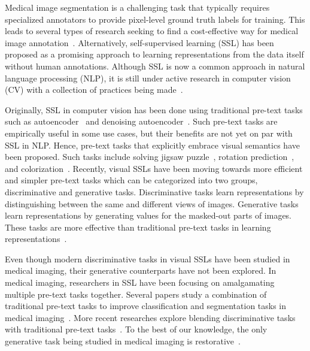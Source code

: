 \documentclass[a4paper,11pt,oneside]{report}
\begin{document}
Medical image segmentation is a challenging task that typically requires specialized annotators to provide pixel-level ground truth labels for training. This leads to several types of research seeking to find a cost-effective way for medical image annotation~\cite{Fu2012, Gal2017, Beluch2018, Rahimi2021}. Alternatively, self-supervised learning (SSL) has been proposed as a promising approach to learning representations from the data itself without human annotations. Although SSL is now a common approach in natural language processing (NLP), it is still under active research in computer vision (CV) with a collection of practices being made~\cite{Balestriero2023}. 

Originally, SSL in computer vision has been done using traditional pre-text tasks such as autoencoder~\cite{Hinton2006} and denoising autoencoder~\cite{Vincent2008}. Such pre-text tasks are empirically useful in some use cases, but their benefits are not yet on par with SSL in NLP. Hence, pre-text tasks that explicitly embrace visual semantics have been proposed. Such tasks include solving jigsaw puzzle~\cite{Noroozi2016}, rotation prediction~\cite{Gidaris2018}, and colorization~\cite{Larsson2017}. Recently, visual SSLs have been moving towards more efficient and simpler pre-text tasks which can be categorized into two groups, discriminative and generative tasks. Discriminative tasks learn representations by distinguishing between the same and different views of images. Generative tasks learn representations by generating values for the masked-out parts of images. These tasks are more effective than traditional pre-text tasks in learning representations~\cite{Chen2020Simple, He2020, He2022, Bao2022beit}.

Even though modern discriminative tasks in visual SSLs have been studied in medical imaging, their generative counterparts have not been explored. In medical imaging, researchers in SSL have been focusing on amalgamating multiple pre-text tasks together. Several papers study a combination of traditional pre-text tasks to improve classification and segmentation tasks in medical imaging~\cite{Noroozi2016, Zhuang2019}. More recent researches explore blending discriminative tasks with traditional pre-text tasks~\cite{Zhou2021, Zhang2021, Dufumier2021, Taleb2020, Zhang2021, He2022Intra, Ren2022}. To the best of our knowledge, the only generative task being studied in medical imaging is restorative~\cite{Pathak2016, Chen2019, Zhou2021, Tang2022, Haghighi2021, Haghighi2024}.
\end{document}

